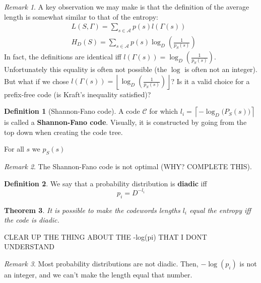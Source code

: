 \documentclass{report}
\theoremstyle{plain}
\newtheorem{thm}{Theorem}
\theoremstyle{definition}
\newtheorem{defn}[thm]{Definition}
\theoremstyle{remark}
\newtheorem*{remark}{Remark}
\begin{document}
\begin{remark}
	A key observation we may make is that the definition of the average length is somewhat similar to that of the entropy:
	\begin{align*}
		&L(S, \Gamma) = \sum_{s \in \mathcal A} p(s) l(\Gamma(s)) \\
		&H_D(S) = \sum_{s \in \mathcal A} p(s) \log_D \left(\frac{1}{p_S(s)}\right)
	\end{align*}
In fact, the definitions are identical iff $l(\Gamma(s)) = \log_D \left(\frac{1}{p_S(s)}\right)$. Unfortunately this equality is often not possible (the $\log$ is often not an integer). But what if we chose $l(\Gamma(s)) = \left\lfloor \log_D \left(\frac{1}{p_S(s)}\right) \right\rfloor$? Is it a valid choice for a prefix-free code (is Kraft's inequality satisfied)?
\end{remark}

\begin{defn}[Shannon-Fano code]
	A code $\mathcal C$ for which $l_i = \left\lceil -\log_D \bigl(P_S(s) \bigr) \right\rceil$ is called a \textbf{Shannon-Fano code}. Visually, it is constructed by going from the top down when creating the code tree.
\end{defn}

For all $s$ we $p_S(s)$
\begin{remark}
	The Shannon-Fano code is not optimal (WHY? COMPLETE THIS).
\end{remark}


\begin{defn}
	We say that a probability distribution is \textbf{diadic} iff
	\begin{equation}
		p_i = D^{-l_i}
	\end{equation}
\end{defn}

\begin{thm}
	It is possible to make the codewords lengths $l_i$ equal the entropy iff the code is diadic.
\end{thm}

CLEAR UP THE THING ABOUT THE -log(pi) THAT I DONT UNDERSTAND

\begin{remark}
	Most probability distributions are not diadic. Then, $-\log(p_i)$ is not an integer, and we can't make the length equal that number.
\end{remark}
\end{document}
